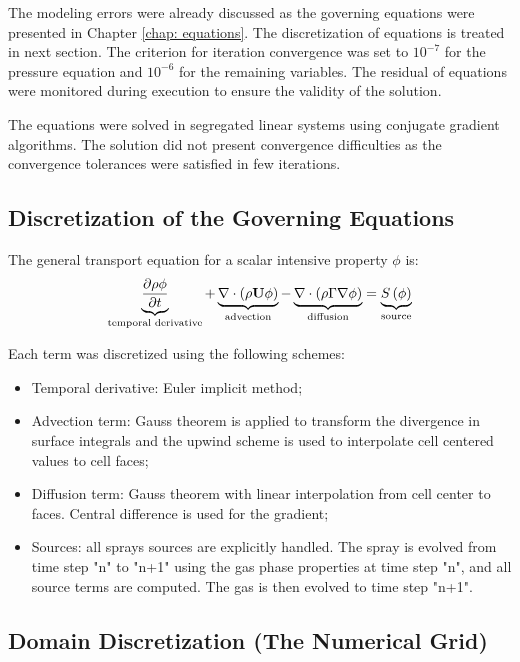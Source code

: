 The modeling errors were already discussed as the governing equations were presented in Chapter \ref{chap: equations}. The discretization of equations is treated in next section. The criterion for iteration convergence was set to $10^{-7}$ for the pressure equation and $10^{-6}$ for the remaining variables. The residual of equations were monitored during execution to ensure the validity of the solution.
 
The equations were solved in segregated linear systems using conjugate gradient algorithms. The solution did not present convergence difficulties as the convergence tolerances were satisfied in few iterations.

\subsection{Discretization of the Governing Equations}
The general transport equation for a scalar intensive property $\phi$ is:
\begin{equation}
 \underbrace{\frac{\partial \rho \phi}{\partial t}}_{\text{temporal derivative}} + \underbrace{\nabla \cdot \left(\rho \mathbf{U} \phi \right)}_{\text{advection}} - \underbrace{\nabla \cdot \left( \rho \Gamma \nabla \phi \right)}_{\text{diffusion}} = \underbrace{S\left(\phi\right)}_{\text{source}}
\end{equation}


Each term was discretized using the following schemes:
\begin{itemize}
 \item Temporal derivative: Euler implicit method;
 \item Advection term: Gauss theorem is applied to transform the divergence in surface integrals and the upwind scheme is used to interpolate cell centered values to cell faces;
 \item Diffusion term: Gauss theorem with linear interpolation from cell center to faces. Central difference is used for the gradient;
 \item Sources: all sprays sources are explicitly handled. The spray is evolved from time step "n" to "n+1" using the gas phase properties at time step "n", and all source terms are computed. The gas is then evolved to time step "n+1".
\end{itemize}

\subsection{Domain Discretization (The Numerical Grid)}

